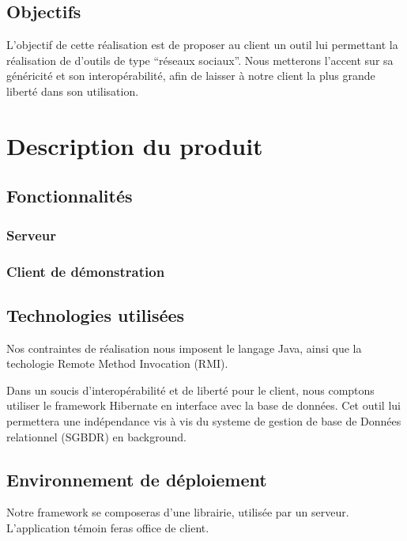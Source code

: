 \documentclass[10pt,a4paper]{article}
\begin{document}
  \subsection{Objectifs}
L'objectif de cette réalisation est de proposer au client un outil lui permettant la réalisation de d'outils de type ``réseaux sociaux''.
Nous metterons l'accent sur sa généricité et son interopérabilité, afin de laisser à notre client la plus grande liberté dans son utilisation.

\section{Description du produit}
 \subsection{Fonctionnalités}
  \subsubsection{Serveur}
  \subsubsection{Client de démonstration}
 \subsection{Technologies utilisées}
Nos contraintes de réalisation nous imposent le langage Java, ainsi que la techologie
Remote Method Invocation (RMI).

Dans un soucis d'interopérabilité et de liberté pour le client, nous comptons utiliser le framework Hibernate en interface avec la base de données. Cet outil lui permettera une indépendance vis à vis du systeme de gestion de base de Données relationnel (SGBDR) en background.

%
 \subsection{Environnement de déploiement}

Notre framework se composeras d'une librairie, utilisée par un serveur. L'application témoin feras office de client.
\end{document}
